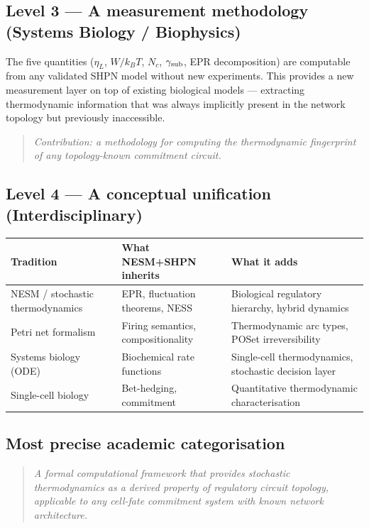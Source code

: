 \documentclass[11pt,a4paper]{article}
\begin{document}
\subsection*{Level 3 — A measurement methodology (Systems Biology / Biophysics)}

The five quantities ($\eta_L$, $W/k_BT$, $N_c$, $\gamma_{\rm sub}$,
EPR decomposition) are computable from any validated SHPN model without
new experiments.
This provides a new measurement layer on top of existing biological models
--- extracting thermodynamic information that was always implicitly present
in the network topology but previously inaccessible.
\begin{quote}
\emph{Contribution: a methodology for computing the thermodynamic
fingerprint of any topology-known commitment circuit.}
\end{quote}

\subsection*{Level 4 — A conceptual unification (Interdisciplinary)}

\begin{center}
\begin{tabular}{p{4cm}p{4.5cm}p{4.5cm}}
\toprule
Tradition & What NESM+SHPN inherits & What it adds \\
\midrule
NESM / stochastic thermodynamics & EPR, fluctuation theorems, NESS &
  Biological regulatory hierarchy, hybrid dynamics \\
Petri net formalism & Firing semantics, compositionality &
  Thermodynamic arc types, POSet irreversibility \\
Systems biology (ODE) & Biochemical rate functions &
  Single-cell thermodynamics, stochastic decision layer \\
Single-cell biology & Bet-hedging, commitment &
  Quantitative thermodynamic characterisation \\
\bottomrule
\end{tabular}
\end{center}

\subsection*{Most precise academic categorisation}

\begin{quote}
\emph{A formal computational framework that provides stochastic
thermodynamics as a derived property of regulatory circuit topology,
applicable to any cell-fate commitment system with known network
architecture.}
\end{quote}
\end{document}
